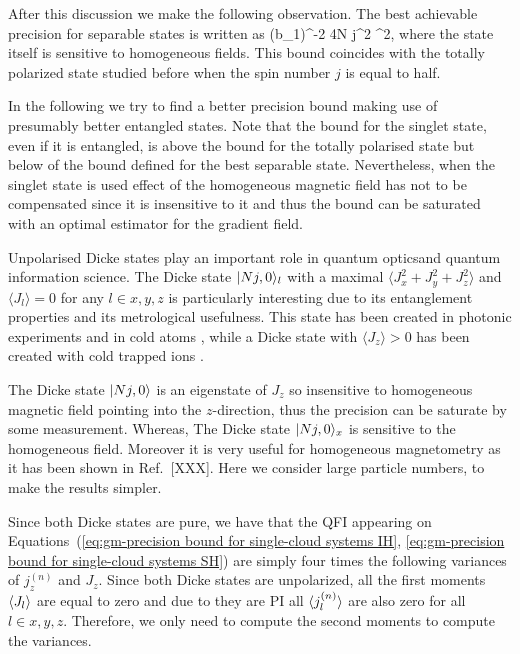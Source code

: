 After this discussion we make the following observation. The best achievable precision for separable states is written as
\be
(\Delta b_1)^{-2} \leqslant 4N j^2 \sigma^2,
\label{eq:gm-best_separable}
\ee
where the state itself is sensitive to homogeneous fields.
This bound coincides with the totally polarized state studied before when the spin number $j$ is equal to half.
\label{obs:precision bound for separable states}

In the following we try to find a better precision bound making use of presumably better entangled states.
Note that the bound for the singlet state, even if it is entangled, is above the bound for the totally polarised state but below of the bound defined for the best separable state.
Nevertheless, when the singlet state is used effect of the homogeneous magnetic field has not to be compensated since it is insensitive to it and thus the bound can be saturated with an optimal estimator for the gradient field.


Unpolarised Dicke states play an important role in quantum opticsand quantum information science.
The Dicke state $\vert{Nj,0}\rangle_l$ with a maximal $\langle J_x^2+J_y^2+J_z^2 \rangle$ and $\langle J_l\rangle=0$ for any $l\in x,y,z$ is particularly interesting due to its entanglement properties and its metrological usefulness.
This state has been created in photonic experiments \cite{Kiesel2007,Wieczorek2009,Chiuri2012} and in cold atoms \cite{Luecke2011,Hamley2012}, while a Dicke state with $\langle J_z\rangle>0$ has been created with cold trapped ions \cite{haeffner2005}.

The Dicke state $\vert{Nj, 0}\rangle$ is an eigenstate of $J_z$ so insensitive to homogeneous magnetic field pointing into the $z$-direction, thus the precision can be saturate by some measurement.
Whereas, The Dicke state $\vert{Nj, 0}\rangle_x$ is sensitive to the homogeneous field.
Moreover it is very useful for homogeneous magnetometry as it has been shown in Ref.~[XXX].
Here we consider large particle numbers, to make the results simpler.

Since both Dicke states are pure, we have that
the QFI appearing on Equations~(\ref{eq:gm-precision bound for single-cloud
systems IH}, \ref{eq:gm-precision bound for single-cloud
systems SH}) are simply four times the following variances of $j_z^{(n)}$ and $J_z$.
Since both Dicke states are unpolarized, all the first moments $\langle{J_l}\rangle$ are equal to zero and due to they are PI all $\langle{j_l^{(n)}}\rangle$ are also zero for all $l\in x,y,z$.
Therefore, we only need to compute the second moments to compute the variances.


